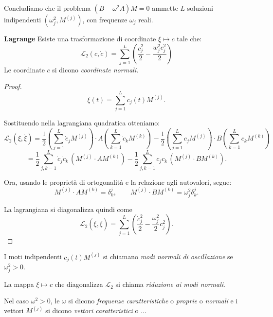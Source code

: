 Concludiamo che il problema $(B - \omega^2 A)M=0$ ammette $L$ soluzioni indipendenti $(\omega_j^2, M^{(j)})$, con frequenze $\omega_j$ reali.



\begin{theorem}
    \textbf{Lagrange}  Esiste una trasformazione di coordinate $\xi\mapsto c $ tale che:
    \begin{equation}
        \mathcal{L}_2(c,\dot{c})= \sum_{j=1}^{L} \left( \frac{\dot{c}_j^2}{2}-\frac{w_j^2c_j^2}{2} \right)
    \end{equation}
    Le coordinate $c $ si dicono \textit{coordinate normali}.
\end{theorem}
\begin{proof}
    \begin{equation}
        \xi(t) = \sum_{j=1}^L c_j(t) M^{(j)}.
    \end{equation}

    Sostituendo nella lagrangiana quadratica otteniamo:
    \begin{equation*}
        \mathcal{L}_2(\xi,\dot{\xi}) 
        = \frac{1}{2} \left( \sum_{j=1}^L \dot{c}_j M^{(j)} \right) \cdot 
        A \left( \sum_{k=1}^L \dot{c}_k M^{(k)} \right) 
        - \frac{1}{2} \left( \sum_{j=1}^L c_j M^{(j)} \right) \cdot 
        B \left( \sum_{k=1}^L c_k M^{(k)} \right) 
    \end{equation*}
    \begin{equation}
        = \frac{1}{2} \sum_{j,k=1}^L \dot{c}_j \dot{c}_k \, (M^{(j)} \cdot A M^{(k)})
        - \frac{1}{2} \sum_{j,k=1}^L c_j c_k \, (M^{(j)} \cdot B M^{(k)}).
    \end{equation}

    Ora, usando le proprietà di ortogonalità e la relazione agli autovalori, segue:
    \begin{equation}
        M^{(j)} \cdot A M^{(k)} = \delta^j_k, 
        \qquad 
        M^{(j)} \cdot B M^{(k)} = \omega_j^2 \delta^j_k.
    \end{equation}

    La lagrangiana si diagonalizza quindi come
    \begin{equation}
        \mathcal{L}_2(\xi,\dot{\xi}) 
        = \sum_{j=1}^L \left( \frac{\dot{c}_j^2}{2} - \frac{\omega_j^2}{2} c_j^2 \right).
    \end{equation}
\end{proof}


\begin{definition}
    I moti indipendenti $c_j(t)M^{(j)}$ si chiamano \textit{modi normali di oscillazione} se $\omega_j^2>0$.
\end{definition}
\begin{definition}
    La mappa $\xi\mapsto c $ che diagonalizza $\mathcal{L}_2$ si chiama \textit{riduzione ai modi normali}.
\end{definition}
\begin{definition}
    Nel caso $\omega^2>0$, le $\omega$ si dicono \textit{frequenze caratteristiche} o \textit{proprie} o \textit{normali} e i vettori $M^{(j)}$ 
    si dicono \textit{vettori caratteristici} o ... 
\end{definition}

